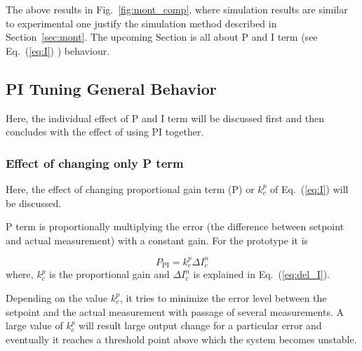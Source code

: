\FloatBarrier
The above results in Fig.~\ref{fig:mont_comp}, where simulation results are similar to experimental one justify the simulation method described in Section~\ref{sec:mont}. The upcoming Section is all about P and I term (see Eq.~(\ref{eq:I}) ) behaviour. 

\subsection{PI Tuning General Behavior}\label{sec:pi_behave}
Here, the individual effect of P and I term will be discussed first and then concludes with the effect of using PI together.

\subsubsection{Effect of changing only P term}
Here, the effect of changing proportional gain term (P) or $k_c^p$ of Eq.~(\ref{eq:I}) will be discussed.

P term is proportionally multiplying the error (the difference between setpoint and actual measurement) with a constant gain. For the prototype it is

\begin{equation}
    P_{\text{PI}}=k_c^p \Delta I_c^n
\end{equation}
where, $k_c^p$ is the proportional gain and $\Delta I_c^n$ is explained in Eq.~(\ref{eq:del_I}).

Depending on the value $k_c^p$, it tries to minimize the error level between the setpoint and the actual measurement with passage of several measurements. A large value of $k_c^p$ will result large output change for a particular error and eventually it reaches a threshold point above which the system becomes unstable. 


